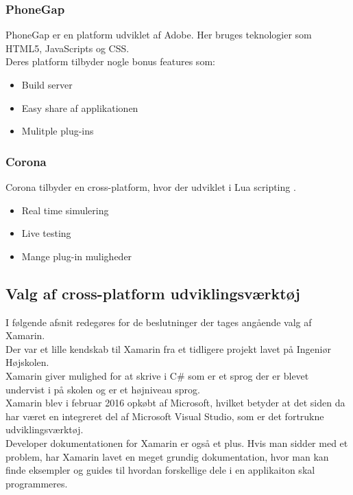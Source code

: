 \subsubsection{PhoneGap}
PhoneGap er en platform udviklet af Adobe\cite{Adobe}. Her bruges teknologier som HTML5\cite{HTML5}, JavaScripts\cite{JavaScript} og CSS\cite{CSS}. \\
Deres platform tilbyder nogle bonus features som:
\begin{itemize}[-]
	\item Build server
	\item Easy share af applikationen 
	\item Mulitple plug-ins
\end{itemize}

\clearpage

\subsubsection{Corona}
Corona tilbyder en cross-platform, hvor der udviklet i Lua scripting \cite{Lua}.
\begin{itemize}[-]
	\item Real time simulering
	\item Live testing
	\item Mange plug-in muligheder
\end{itemize}

\subsection{Valg af cross-platform udviklingsværktøj}
I følgende afsnit redegøres for de beslutninger der tages angående valg af Xamarin. \\

Der var et lille kendskab til Xamarin fra et tidligere projekt lavet på Ingeniør Højskolen. \\
Xamarin giver mulighed for at skrive i C\# som er et sprog der er blevet undervist i på skolen og er et højniveau sprog. \\
Xamarin blev i februar 2016 opkøbt af Microsoft, hvilket betyder at det siden da har været en integreret del af Microsoft Visual Studio, som er det fortrukne udviklingsværktøj.\\
Developer dokumentationen for Xamarin er også et plus. Hvis man sidder med et problem, har Xamarin lavet en meget grundig dokumentation, hvor man kan finde eksempler og guides til hvordan forskellige dele i en applikaiton skal programmeres.

